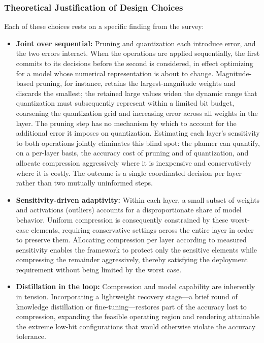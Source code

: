 \documentclass[
11pt, %
english, %
singlespacing, %
headsepline, %
]{MastersDoctoralThesis} %
\begin{document}
\subsubsection{Theoretical Justification of Design Choices}

Each of these choices rests on a specific finding from the survey:

\begin{itemize}

  \item \textbf{Joint over sequential:} Pruning and quantization each introduce error, and the two errors interact. When the operations are applied sequentially, the first commits to its decisions before the second is considered, in effect optimizing for a model whose numerical representation is about to change. Magnitude-based pruning, for instance, retains the largest-magnitude weights and discards the smallest; the retained large values widen the dynamic range that quantization must subsequently represent within a limited bit budget, coarsening the quantization grid and increasing error across all weights in the layer. The pruning step has no mechanism by which to account for the additional error it imposes on quantization. Estimating each layer's sensitivity to both operations jointly eliminates this blind spot: the planner can quantify, on a per-layer basis, the accuracy cost of pruning and of quantization, and allocate compression aggressively where it is inexpensive and conservatively where it is costly. The outcome is a single coordinated decision per layer rather than two mutually uninformed steps.

  \item \textbf{Sensitivity-driven adaptivity:} Within each layer, a small subset of weights and activations (outliers) accounts for a disproportionate share of model behavior. Uniform compression is consequently constrained by these worst-case elements, requiring conservative settings across the entire layer in order to preserve them. Allocating compression per layer according to measured sensitivity enables the framework to protect only the sensitive elements while compressing the remainder aggressively, thereby satisfying the deployment requirement without being limited by the worst case.

  \item \textbf{Distillation in the loop:} Compression and model capability are inherently in tension. Incorporating a lightweight recovery stage---a brief round of knowledge distillation or fine-tuning---restores part of the accuracy lost to compression, expanding the feasible operating region and rendering attainable the extreme low-bit configurations that would otherwise violate the accuracy tolerance.


\end{itemize}
\end{document}
